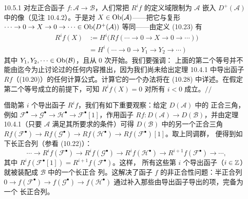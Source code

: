 \begin{wexam}{10.5.1}
对左正合函子 $f:\mathcal A\to\mathcal B$，人们常把 $R^if$ 的定义域限制为
$\mathcal A$ 嵌入 $D^+(\mathcal A)$ 中的像（见注 10.4.2）。于是对
$X\in\operatorname{Ob}(\mathcal A)$——把它与复形
$\cdots\to0\to X\to0\to\cdots\in\operatorname{Ob}(D^+(\mathcal A))$ 等同——由定义
(10.23) 有
\begin{align*}
  R^if(X)&:=H^i\bigl(Rf(\cdots\to0\to X\to0\to\cdots)\bigr)\\
  &=H^i(\cdots\to0\to Y_1\to Y_2\to\cdots)
\end{align*}
其中 $Y_1,Y_2,\cdots\in\operatorname{Ob}(\mathcal B)$，且从 $0$ 次开始。我们要强调：
上面的第二个等号并不能由迄今为止讨论过的任何内容推出，因为我们尚未给出定理
10.4.1 中导出函子 $Rf$（(10.20)）的任何计算公式。计算它的一个办法将在
(10.28) 中详述。在假定第二个等号成立的前提下，可知 $R^if(X)=0$ 对所有
$i<0$ 成立。\hfill$//$
\end{wexam}


借助第 $i$ 个导出函子 $R^if$，我们有如下重要观察：给定 $D(\mathcal A)$ 中的
正合三角，例如
$\mathcal F^{\bullet}\to\mathcal G^{\bullet}\to\mathcal H^{\bullet}
\to\mathcal F^{\bullet}[1]$，作用函子
$Rf:D(\mathcal A)\to D(\mathcal B)$，并由定理 10.4.1（只要 $\mathcal A$
满足其所要求的条件）可得 $D(\mathcal B)$ 中的另一个正合三角
$Rf(\mathcal F^{\bullet})\to Rf(\mathcal G^{\bullet})
\to Rf(\mathcal H^{\bullet})\to Rf(\mathcal F^{\bullet})[1]$。取上同调群，
便得到如下长正合列（参看 (10.22)）：
\begin{equation}\tag{10.24}
  \cdots\to R^if(\mathcal F^{\bullet})
  \to R^if(\mathcal G^{\bullet})
  \to R^if(\mathcal H^{\bullet})
  \to R^{i+1}f(\mathcal F^{\bullet})\to\cdots,
\end{equation}
其中 $R^if(\mathcal F^{\bullet}[1])=R^{i+1}f(\mathcal F^{\bullet})$。这样，
所有这些第 $i$ 个导出函子（$i\in\mathbb{Z}$）就被装配成 $\mathcal B$ 中的一个长正合
列。这解决了函子 $f$ 的非正合性问题：半正合列
$0\to f(\mathcal F^{\bullet})\to f(\mathcal G^{\bullet})
\to f(\mathcal H^{\bullet})$ 通过补入那些由导出函子导出的项，完备为一个
长正合列。

